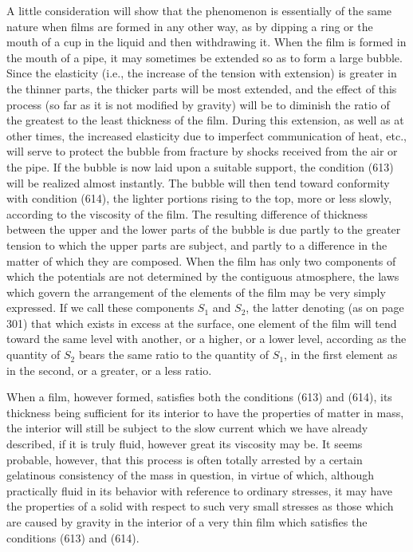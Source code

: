 \documentclass[12pt]{memoir}
\begin{document}
A little consideration will show that the phenomenon is essentially of the same nature when films are formed in any other way, as by dipping a ring or the mouth of a cup in the liquid and then withdrawing it. When the film is formed in the mouth of a pipe, it may sometimes be extended so as to form a large bubble. Since the elasticity (i.e., the increase of the tension with extension) is greater in the thinner parts, the thicker parts will be most extended, and the effect of this process (so far as it is not modified by gravity) will be to diminish the ratio of the greatest to the least thickness of the film. During this extension, as well as at other times, the increased elasticity due to imperfect communication of heat, etc., will serve to protect the bubble from fracture by shocks received from the air or the pipe. If the bubble is now laid upon a suitable support, the condition (613) will be realized almost instantly. The bubble will then tend toward conformity with condition (614), the lighter portions rising to the top, more or less slowly, according to the viscosity of the film. The resulting difference of thickness between the upper and the lower parts of the bubble is due partly to the greater tension to which the upper parts are subject, and partly to a difference in the matter of which they are composed. When the film has only two components of which the potentials are not determined by the contiguous atmosphere, the laws which govern the arrangement of the elements of the film may be very simply expressed. If we call these components $S_1$ and $S_2$, the latter denoting (as on page 301) that which exists in excess at the surface, one element of the film will tend toward the same level with another, or a higher, or a lower level, according as the quantity of $S_2$ bears the same ratio to the quantity of $S_1$, in the first element as in the second, or a greater, or a less ratio.

When a film, however formed, satisfies both the conditions (613) and (614), its thickness being sufficient for its interior to have the properties of matter in mass, the interior will still be subject to the slow current which we have already described, if it is truly fluid, however great its viscosity may be. It seems probable, however, that this process is often totally arrested by a certain gelatinous consistency of the mass in question, in virtue of which, although practically fluid in its behavior with reference to ordinary stresses, it may have the properties of a solid with respect to such very small stresses as those which are caused by gravity in the interior of a very thin film which satisfies the conditions (613) and (614).
\end{document}
